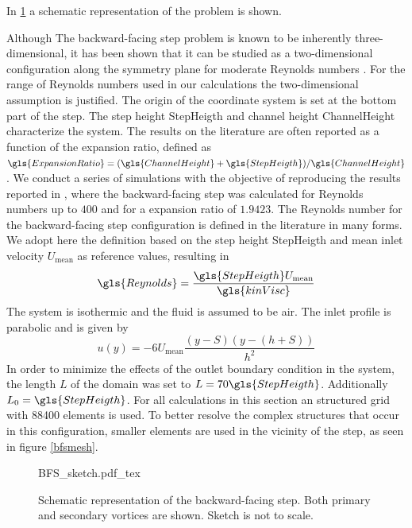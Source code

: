In \cref{BFSsketch} a schematic representation of the problem is shown. 

Although The backward-facing step problem is known to be inherently three-dimensional, it has been shown that it can be studied as a two-dimensional configuration along the symmetry plane for moderate Reynolds numbers \citep{barkleyThreedimensionalInstabilityFlow2000, biswasBackwardFacingStepFlows2004}. For the range of Reynolds numbers used in our calculations the two-dimensional assumption is justified.  The origin of the coordinate system is set at the bottom part of the step. The step height \gls{StepHeigth} and channel height \gls{ChannelHeight} characterize the system. The results on the literature are often reported as a function of the expansion ratio, defined as $\gls{ExpansionRatio} = (\gls{ChannelHeight}+\gls{StepHeigth})/\gls{ChannelHeight}$. 
We conduct a series of simulations with the objective of reproducing the results reported in \cite{biswasBackwardFacingStepFlows2004}, where the backward-facing step was calculated for Reynolds numbers up to $400$ and for a expansion ratio of $1.9423$. 
The Reynolds number for the backward-facing step configuration is defined in the literature in many forms. We adopt here the definition based on the step height \gls{StepHeigth} and mean inlet velocity $U_{\text{mean}}$ as reference values, resulting in
\begin{equation}
\gls{Reynolds}= \frac{\gls{StepHeigth}U_{\text{mean}}}{\gls{kinVisc}}
\end{equation} 
The system is isothermic and the fluid is assumed to be air. The inlet profile is parabolic and is given by
\begin{equation}
u(y) = -6U_{\text{mean}}\frac{(y-S)(y-(h+S))}{h^2}
\end{equation}
In order to minimize the effects of the outlet  boundary condition in the system, the length $L$ of the domain was set to $L = 70 \gls{StepHeigth}$. Additionally  $L_0 = \gls{StepHeigth}$. For all calculations in this section an structured grid with 88400 elements is used. To better resolve the complex structures that occur in this configuration, smaller elements are used in the vicinity of the step, as seen in figure \cref{bfsmesh}.

\begin{figure}[tb]
	\begin{center}
		\def\svgwidth{0.9\textwidth}
		{BFS_sketch.pdf_tex}		
		\caption{Schematic representation of the backward-facing step. Both primary and secondary vortices are shown. Sketch is not to scale.}
		\label{BFSsketch}
	\end{center}	
\end{figure} 

